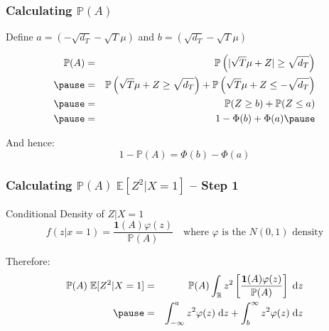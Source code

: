 \begin{frame}
  \frametitle{Calculating $\mathbb{P}(A)$}
  Define $a = (-\sqrt{d_T} - \sqrt{T}\mu)$ and $b = (\sqrt{d_T} - \sqrt{T}\mu)$ 

  \pause

  \begin{eqnarray*}
    \mathbb{P}(A) &=& \mathbb{P}\left( |\sqrt{T}\mu + Z| \geq \sqrt{d_T} \right) \\ \pause
    &=& \mathbb{P}\left( \sqrt{T}\mu + Z \geq \sqrt{d_T} \right) + \mathbb{P}\left( \sqrt{T}\mu + Z \leq -\sqrt{d_T} \right) \\ \pause
    &=& \mathbb{P}(Z\geq b) + \mathbb{P}(Z \leq a)\\ \pause
    &=& 1 - \Phi(b) + \Phi(a) \pause
  \end{eqnarray*}


  And hence:
  \[
    1 - \mathbb{P}(A) = \Phi(b) - \Phi(a)
  \]
\end{frame}
\begin{frame}
  \frametitle{Calculating $\mathbb{P}(A)\;\mathbb{E}[Z^2|X=1]$ -- Step 1}
  \begin{block}{Conditional Density of $Z|X=1$}
    \vspace{-1em}
    \[f(z|x=1) = \frac{\mathbf{1}(A)\varphi(z)}{\mathbb{P}(A)} \quad \text{where } \varphi \text{ is the } N(0,1) \text{ density} \]
  \end{block}

  \pause

  \begin{block}{Therefore:}
    \begin{eqnarray*}
      \mathbb{P}(A)\; \mathbb{E}[Z^2|X=1] &=& \mathbb{P}(A) \int_{\mathbb{R}} z^2 \left[ \frac{\mathbf{1}(A)\varphi(z)}{\mathbb{P}(A)} \right]\; \text{d}z\\ \pause 
       &=&  \int_{-\infty}^a z^2 \varphi(z)\; \text{d}z + \int_{b}^\infty z^2 \varphi(z)\; \text{d}z\\ 
    \end{eqnarray*}
  \end{block}
\end{frame}
